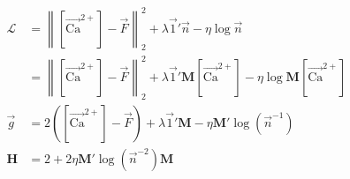 \documentclass[12pt]{article}
\providecommand{\ve}[1]{\vec{#1}}
\providecommand{\ma}[1]{\boldsymbol{#1}}
\providecommand{\norm}[1]{\left \lVert#1 \right  \rVert}
\providecommand{\ve}[1]{\boldsymbol{#1}}
\newcommand{\Lik}{\mathcal{L}}
\newcommand{\Cav}{[\ve{\text{Ca}}^{2+}]}
\begin{document}
\begin{align}
\Lik &= \norm{\Cav-\ve{F}}^2_2 + \lambda \ve{1}' \ve{n} - \eta \log \ve{n}\\
&= \norm{\Cav-\ve{F}}^2_2 + \lambda \ve{1}' \ma{M} \Cav - \eta \log \ma{M} \Cav\\
\ve{g} &= 2(\Cav - \ve{F}) +\lambda \ve{1}' \ma{M} - \eta \ma{M}' \log (\ve{n}^{-1})\\
\ma{H} &= 2 + 2 \eta \ma{M}' \log(\ve{n}^{-2}) \ma{M}
\end{align}
\end{document}
